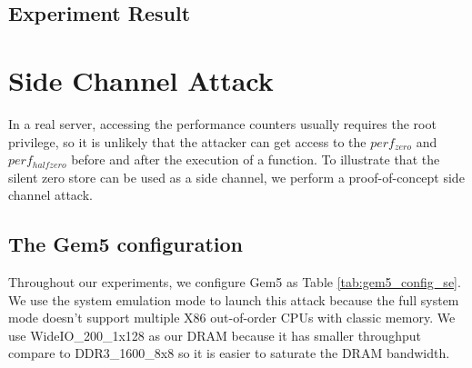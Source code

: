 \documentclass{iacrtrans}
\begin{document}
\subsection{Experiment Result}


\section{Side Channel Attack}
In a real server, accessing the performance counters usually requires the root privilege, so it is unlikely that the attacker can get access to the $perf_{zero}$ and $perf_{halfzero}$ before and after the execution of a function. To illustrate that the silent zero store can be used as a side channel, we perform a proof-of-concept side channel attack.

\subsection{The Gem5 configuration}
Throughout our experiments, we configure Gem5 as Table \ref{tab:gem5_config_se}. We use the system emulation mode to launch this attack because the full system mode doesn't support multiple X86 out-of-order CPUs with classic memory\cite{gem5fail}. We use WideIO\_200\_1x128 as our DRAM because it has smaller throughput compare to DDR3\_1600\_8x8 so it is easier to saturate the DRAM bandwidth. 
\end{document}
